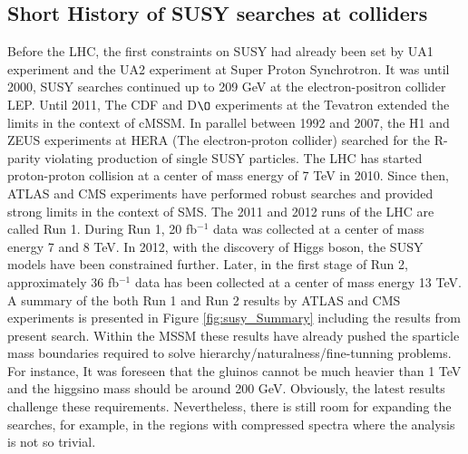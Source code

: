 \subsection{Short History of SUSY searches at colliders}
\label{sec:histSus}
Before the LHC, the first constraints on SUSY had already been set by UA1 experiment and the UA2 experiment at Super Proton Synchrotron. It was until 2000, SUSY searches continued up to 209 GeV at the electron-positron collider LEP. Until 2011, The CDF and D$\O$ experiments at the Tevatron extended the limits in the context of cMSSM. In parallel between 1992 and 2007, the H1 and ZEUS experiments at HERA (The electron-proton collider) searched for the R-parity violating production of single SUSY particles. The LHC has started proton-proton collision at a center of mass energy of 7 TeV in 2010. Since then, ATLAS and CMS experiments have performed robust searches and provided strong limits in the context of SMS. The 2011 and 2012 runs of the LHC are called Run 1. During Run 1, 20 fb$^{-1}$ data was collected at a center of mass energy 7 and 8 TeV. In 2012, with the discovery of Higgs boson, the SUSY models have been constrained further. Later, in the first stage of Run 2, approximately 36 fb$^{-1}$ data has been collected at a center of mass energy 13 TeV. A summary of the both Run 1 and Run 2 results by ATLAS and CMS experiments is presented in Figure \ref{fig:susy_Summary} including the results from present search. Within the MSSM these results have already pushed the sparticle mass boundaries required to solve hierarchy/naturalness/fine-tunning problems. For instance, It was foreseen that the gluinos cannot be much heavier than 1 TeV and the higgsino mass should be around 200 GeV.  Obviously, the latest results challenge these requirements.  Nevertheless, there is still room for expanding the searches, for example, in the regions with compressed spectra where the analysis is not so trivial. 
